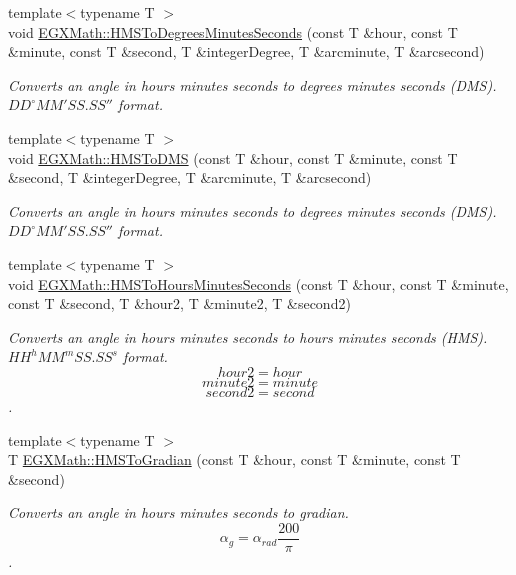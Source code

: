 \begin{DoxyCompactItemize}
{\footnotesize template$<$typename T $>$ }\\void \mbox{\hyperlink{group___e_g_x_math-_angle_conversions-_h_m_s_ga7f694aec9b3e7cc9d94d510e27e4403f}{E\+G\+X\+Math\+::\+H\+M\+S\+To\+Degrees\+Minutes\+Seconds}} (const T \&hour, const T \&minute, const T \&second, T \&integer\+Degree, T \&arcminute, T \&arcsecond)
\begin{DoxyCompactList}\small\item\em Converts an angle in hours minutes seconds to degrees minutes seconds (D\+MS). ${DD}^{\circ}{MM}'{SS.SS}''$ format. \end{DoxyCompactList}\item 
{\footnotesize template$<$typename T $>$ }\\void \mbox{\hyperlink{group___e_g_x_math-_angle_conversions-_h_m_s_ga7a875e85b32c4d7a8c6fa9a833f2bf7a}{E\+G\+X\+Math\+::\+H\+M\+S\+To\+D\+MS}} (const T \&hour, const T \&minute, const T \&second, T \&integer\+Degree, T \&arcminute, T \&arcsecond)
\begin{DoxyCompactList}\small\item\em Converts an angle in hours minutes seconds to degrees minutes seconds (D\+MS). ${DD}^{\circ}{MM}'{SS.SS}''$ format. \end{DoxyCompactList}\item 
{\footnotesize template$<$typename T $>$ }\\void \mbox{\hyperlink{group___e_g_x_math-_angle_conversions-_h_m_s_gaf9acea32cca77104b92fe10fe0d1595f}{E\+G\+X\+Math\+::\+H\+M\+S\+To\+Hours\+Minutes\+Seconds}} (const T \&hour, const T \&minute, const T \&second, T \&hour2, T \&minute2, T \&second2)
\begin{DoxyCompactList}\small\item\em Converts an angle in hours minutes seconds to hours minutes seconds (H\+MS). ${HH}^h{MM}^m{SS.SS}^s$ format. \[hour2 = hour \] \[minute2 = minute\] \[second2 = second\]. \end{DoxyCompactList}\item 
{\footnotesize template$<$typename T $>$ }\\T \mbox{\hyperlink{group___e_g_x_math-_angle_conversions-_h_m_s_ga89aaece52b0760559444d0303bee3bf1}{E\+G\+X\+Math\+::\+H\+M\+S\+To\+Gradian}} (const T \&hour, const T \&minute, const T \&second)
\begin{DoxyCompactList}\small\item\em Converts an angle in hours minutes seconds to gradian. \[\alpha_{g}=\alpha_{rad}\frac{200}{\pi}\]. \end{DoxyCompactList}\item 

\end{DoxyCompactItemize}
